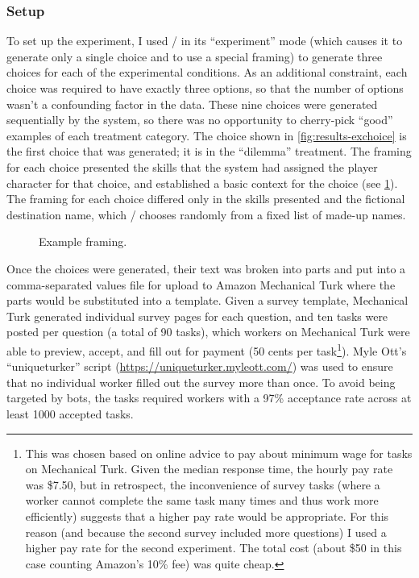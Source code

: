 \subsubsection{Setup}

To set up the experiment, I used \dunyazad/ in its ``experiment'' mode (which causes it to generate only a single choice and to use a special framing) to generate three choices for each of the experimental conditions.
%
As an additional constraint, each choice was required to have exactly three options, so that the number of options wasn't a confounding factor in the data.
%
These nine choices were generated sequentially by the system, so there was no opportunity to cherry-pick ``good'' examples of each treatment category.
%
The choice shown in \cref{fig:results-exchoice} is the first choice that was generated; it is in the ``dilemma'' treatment.
%
The framing for each choice presented the skills that the system had assigned the player character for that choice, and established a basic context for the choice (see \cref{fig:exframing}).
%
The framing for each choice differed only in the skills presented and the fictional destination name, which \dunyazad/ chooses randomly from a fixed list of made-up names.


\begin{figure}[!h]
  \caption{Example framing.}
  \label{fig:exframing}
\end{figure}


Once the choices were generated, their text was broken into parts and put into a comma-separated values file for upload to Amazon Mechanical Turk where the parts would be substituted into a template.
%
Given a survey template, Mechanical Turk generated individual survey pages for each question, and ten tasks were posted per question (a total of 90 tasks), which workers on Mechanical Turk were able to preview, accept, and fill out for payment (50 cents per task\footnote{This was chosen based on online advice to pay about minimum wage for tasks on Mechanical Turk. Given the median response time, the hourly pay rate was \$7.50, but in retrospect, the inconvenience of survey tasks (where a worker cannot complete the same task many times and thus work more efficiently) suggests that a higher pay rate would be appropriate. For this reason (and because the second survey included more questions) I used a higher pay rate for the second experiment. The total cost (about \$50 in this case counting Amazon's 10\% fee) was quite cheap.}).
%
Myle Ott's ``uniqueturker'' script (\url{https://uniqueturker.myleott.com/}) was used to ensure that no individual worker filled out the survey more than once.
%
To avoid being targeted by bots, the tasks required workers with a 97\% acceptance rate across at least 1000 accepted tasks.

